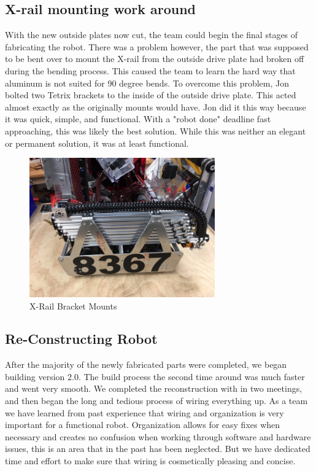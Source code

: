 \documentclass{article}
\begin{document}
\subsection{X-rail mounting work around}
With the new outside plates now cut, the team could begin the final stages of fabricating the robot. There was a problem however, the part that was supposed to be bent over to mount the X-rail from the outside drive plate had broken off during the bending process. This caused the team to learn the hard way that aluminum is not suited for 90 degree bends. To overcome this problem, Jon bolted two Tetrix brackets to the inside of the outside drive plate. This acted almost exactly as the originally mounts would have. Jon did it this way because it was quick, simple, and functional. With a "robot done" deadline fast approaching, this was likely the best solution. While this was neither an elegant or permanent solution, it was at least functional.

\begin{figure}
    \centering
    \includegraphics[height=6cm]{18_12-31/images/X-Rail Mount.JPG}
    \caption{X-Rail Bracket Mounts}
    \label{X-Rail Mounts}
\end{figure}



\subsection{Re-Constructing Robot}
After the majority of the newly fabricated parts were completed, we began building version 2.0. The build process the second time around was much faster and went very smooth. We completed the reconstruction with in two meetings, and then began the long and tedious process of wiring everything up. As a team we have learned from past experience that wiring and organization is very important for a functional robot. Organization allows for easy fixes when necessary and creates no confusion when working through software and hardware issues, this is an area that in the past has been neglected. But we have dedicated time and effort to make sure that wiring is cosmetically pleasing and concise. 
\end{document}
